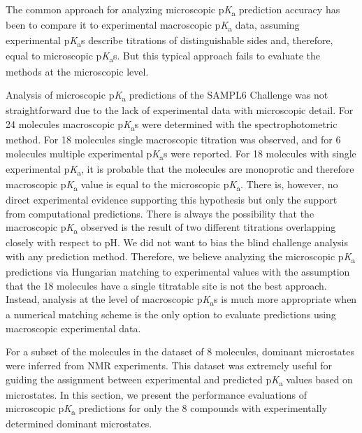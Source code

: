 \documentclass[9pt,lineno,final]{elife}
\newcommand{\pKa}{p\textit{K}\textsubscript{a}}
\begin{document}
The common approach for analyzing microscopic \pKa{} prediction accuracy has been to compare it to experimental macroscopic \pKa{} data, assuming experimental \pKa{}s describe titrations of distinguishable sides and, therefore, equal to microscopic \pKa{}s. But this typical approach fails to evaluate the methods at the microscopic level.

Analysis of microscopic \pKa{} predictions of the SAMPL6 Challenge was not straightforward due to the lack of experimental data with microscopic detail. For 24 molecules macroscopic \pKa{}s were determined with the spectrophotometric method. 
For 18 molecules single macroscopic titration was observed, and for 6 molecules multiple experimental \pKa{}s were reported. 
For 18 molecules with single experimental \pKa{}, it is probable that the molecules are monoprotic and therefore macroscopic \pKa{} value is equal to the microscopic \pKa{}.
There is, however, no direct experimental evidence supporting this hypothesis but only the support from computational predictions. 
There is always the possibility that the macroscopic \pKa{} observed is the result of two different titrations overlapping closely with respect to pH. 
We did not want to bias the blind challenge analysis with any prediction method. 
Therefore, we believe analyzing the microscopic \pKa{} predictions via Hungarian matching to experimental values with the assumption that the 18 molecules have a single titratable site is not the best approach. 
Instead, analysis at the level of macroscopic \pKa{}s is much more appropriate when a numerical matching scheme is the only option to evaluate predictions using macroscopic experimental data.

For a subset of the molecules in the dataset of 8 molecules, dominant microstates were inferred from NMR experiments. This dataset was extremely useful for guiding the assignment between experimental and predicted \pKa{} values based on microstates. In this section, we present the performance evaluations of microscopic \pKa{} predictions for only the 8 compounds with experimentally determined dominant microstates.
\end{document}
